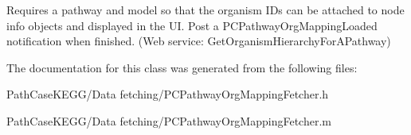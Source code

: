 Requires a pathway and model so that the organism IDs can be attached to node info objects and displayed in the UI. Post a {\ttfamily PCPathwayOrgMappingLoaded} notification when finished. (Web service: {\ttfamily GetOrganismHierarchyForAPathway}) 

The documentation for this class was generated from the following files:\begin{DoxyCompactItemize}
\item 
PathCaseKEGG/Data fetching/PCPathwayOrgMappingFetcher.h\item 
PathCaseKEGG/Data fetching/PCPathwayOrgMappingFetcher.m\end{DoxyCompactItemize}
